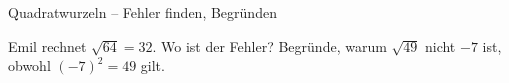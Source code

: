 \begin{aufgabe}{Quadratwurzeln – Fehler finden, Begründen}
\begin{teile}
\teil Emil rechnet $\sqrt{64} = 32$. Wo ist der Fehler?
\teil Begründe, warum $\sqrt{49}$ nicht $-7$ ist, obwohl $(-7)^2 = 49$ gilt.
\end{teile}
\end{aufgabe}
